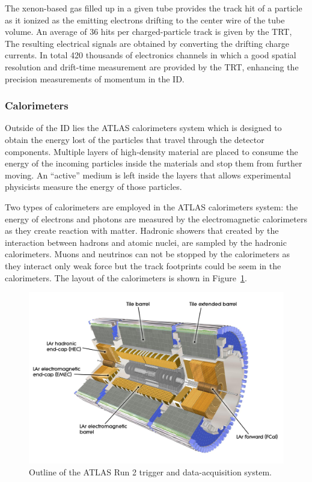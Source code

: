 \documentclass[UTF8,12pt]{ctexart}
\numberwithin{equation}{section}
\begin{document}
\begin{description}
 The xenon-based gas filled up in a given tube provides the track hit of a particle as it ionized as the emitting electrons drifting to the center wire of the tube volume. An average of 36 hits per charged-particle track is given by the TRT, 
 The resulting electrical signals are obtained by converting the drifting charge currents. In total 420 thousands of electronics channels in which a good spatial resolution and drift-time measurement are provided by the TRT, enhancing the precision measurements of momentum in the ID.  
 

\end{description}

\subsubsection{Calorimeters}
\label{sec:3.2.2}

Outside of the ID lies the ATLAS calorimeters system which is designed to obtain the energy lost of the particles that travel through the detector components. Multiple layers of high-density material are placed to consume the energy of the incoming particles inside the materials and stop them from further moving.  An “active” medium is left inside the layers that allows experimental physicists measure the energy of those particles.

Two types of calorimeters are employed in the ATLAS calorimeters system: the energy of electrons and photons are measured by the electromagnetic calorimeters as they create reaction with matter. Hadronic showers that created by the interaction between hadrons and atomic nuclei, are sampled by the hadronic calorimeters. Muons and neutrinos can not be stopped by the calorimeters as they interact only weak force but the track footprints could be seem in the calorimeters. The layout of the calorimeters is shown in Figure~\ref{Fig.calo1}.

\begin{figure}[htb] 
	\centering  
	\includegraphics[width=15cm]{./fig/calo1.jpg}	\caption{Outline of the ATLAS Run 2 trigger and data-acquisition system.}
	\label{Fig.calo1}
\end{figure}
\end{document}

